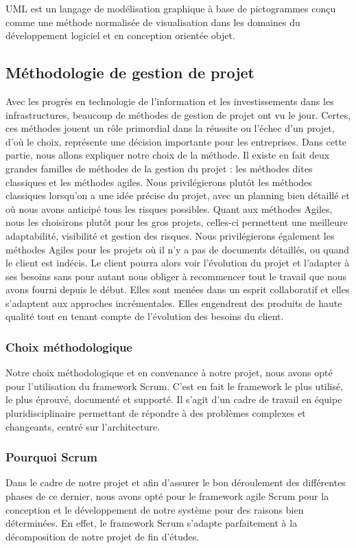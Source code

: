\medskip

UML\cite{umlCite} est un langage de modélisation graphique à base de pictogrammes conçu comme une méthode normalisée de visualisation dans les domaines du développement logiciel et en conception orientée objet.



\subsection{Méthodologie de gestion de projet}
Avec les progrès en technologie de l'information et les investissements dans les infrastructures, beaucoup de méthodes de gestion de projet ont vu le jour. Certes, ces méthodes jouent un rôle primordial dans la réussite ou l'échec d'un projet, d'où le choix, représente une décision importante pour les entreprises. Dans cette partie, nous allons expliquer notre choix de la méthode. Il existe en fait deux grandes familles de méthodes de la gestion du projet : les méthodes dites classiques et les méthodes agiles. Nous privilégierons plutôt les méthodes classiques lorsqu'on a une idée précise du projet, avec un planning bien détaillé et où nous avons anticipé tous les risques possibles. Quant aux méthodes Agiles, nous les choisirons plutôt pour les gros projets, celles-ci permettent une meilleure adaptabilité, visibilité et gestion des risques. Nous privilégierons également les méthodes Agiles pour les projets où il n'y a pas de documents détaillés, ou quand le client est indécis. Le client pourra alors voir l'évolution du projet et l'adapter à ses besoins sans pour autant nous obliger à recommencer tout le travail que nous avons fourni depuis le début. Elles sont menées dans un esprit collaboratif et elles s'adaptent aux approches incrémentales. Elles engendrent des produits de haute qualité tout en tenant compte de l'évolution des besoins du client.

\subsubsection{Choix méthodologique}
Notre choix méthodologique et en convenance à notre projet, nous avons opté pour l'utilisation du framework Scrum. C'est en fait le framework le plus utilisé, le plus éprouvé, documenté et supporté. Il s'agit d'un cadre de travail en équipe pluridisciplinaire permettant de répondre à des problèmes complexes et changeants, centré sur l'architecture.
\subsubsection{Pourquoi Scrum}
Dans le cadre de notre projet et afin d'assurer le bon déroulement des différentes phases de ce dernier, nous avons opté pour le framework agile Scrum pour la conception et le développement de notre système pour des raisons bien déterminées. En effet, le framework Scrum s'adapte parfaitement à la décomposition de notre projet de fin d'études.

